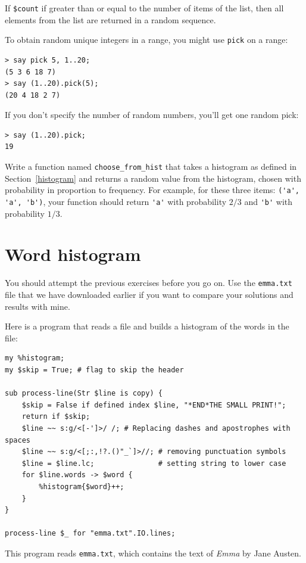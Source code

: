If \verb'$count' if greater than or equal to the number of 
items of the list, then all elements from the list are returned 
in a random sequence.

To obtain random unique integers in a range, you might use 
{\tt pick} on a range:

\begin{verbatim}
> say pick 5, 1..20;
(5 3 6 18 7)
> say (1..20).pick(5);
(20 4 18 2 7)
\end{verbatim}

If you don't specify the number of random numbers, you'll get one 
random pick:

\begin{verbatim}
> say (1..20).pick;
19
\end{verbatim}
%


\begin{exercise}

Write a function named \verb"choose_from_hist" that takes
a histogram as defined in Section~\ref{histogram} and returns a 
random value from the histogram, chosen with probability
in proportion to frequency.  For example, for these three 
items: \verb"('a', 'a', 'b')", your function should 
return \verb"'a'" with probability $2/3$ and \verb"'b'" 
with probability $1/3$.
\end{exercise}


\section{Word histogram}

You should attempt the previous exercises before you go on. 
Use the {\tt emma.txt} file that we have downloaded earlier 
if you want to compare your solutions and results with mine. 

Here is a program that reads a file and builds a histogram of the
words in the file:

\begin{verbatim}
my %histogram;
my $skip = True; # flag to skip the header

sub process-line(Str $line is copy) {
    $skip = False if defined index $line, "*END*THE SMALL PRINT!";
    return if $skip;
    $line ~~ s:g/<[-']>/ /; # Replacing dashes and apostrophes with spaces
    $line ~~ s:g/<[;:,!?.()"_`]>//; # removing punctuation symbols
    $line = $line.lc;               # setting string to lower case
    for $line.words -> $word {
        %histogram{$word}++;
    }
}

process-line $_ for "emma.txt".IO.lines; 

\end{verbatim}
%
This program reads {\tt emma.txt}, which contains the text of 
{\em Emma} by Jane Austen.

